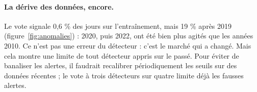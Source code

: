 \paragraph{La dérive des données, encore.} Le vote signale 0,6 \% des jours sur l'entraînement, mais 19 \% après 2019 (figure~\ref{fig:anomalies}) : 2020, puis 2022, ont été bien plus agités que les années 2010. Ce n'est pas une erreur du détecteur : c'est le marché qui a changé. Mais cela montre une limite de tout détecteur appris sur le passé. Pour éviter de banaliser les alertes, il faudrait recalibrer périodiquement les seuils sur des données récentes ; le vote à trois détecteurs sur quatre limite déjà les fausses alertes.
